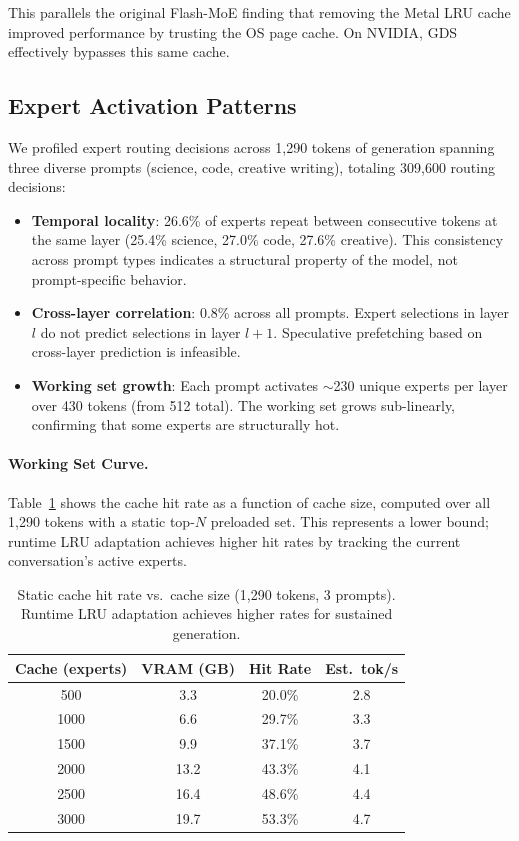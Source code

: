 \documentclass[11pt]{article}
\begin{document}
This parallels the original Flash-MoE finding that removing the Metal LRU cache improved performance by trusting the OS page cache. On NVIDIA, GDS effectively bypasses this same cache.

\subsection{Expert Activation Patterns}

We profiled expert routing decisions across 1,290 tokens of generation spanning three diverse prompts (science, code, creative writing), totaling 309,600 routing decisions:

\begin{itemize}[nosep]
    \item \textbf{Temporal locality}: 26.6\% of experts repeat between consecutive tokens at the same layer (25.4\% science, 27.0\% code, 27.6\% creative). This consistency across prompt types indicates a structural property of the model, not prompt-specific behavior.
    \item \textbf{Cross-layer correlation}: 0.8\% across all prompts. Expert selections in layer $l$ do not predict selections in layer $l+1$. Speculative prefetching based on cross-layer prediction is infeasible.
    \item \textbf{Working set growth}: Each prompt activates $\sim$230 unique experts per layer over 430 tokens (from 512 total). The working set grows sub-linearly, confirming that some experts are structurally hot.
\end{itemize}

\paragraph{Working Set Curve.} Table~\ref{tab:workingset} shows the cache hit rate as a function of cache size, computed over all 1,290 tokens with a static top-$N$ preloaded set. This represents a lower bound; runtime LRU adaptation achieves higher hit rates by tracking the current conversation's active experts.

\begin{table}[h]
\centering
\small
\caption{Static cache hit rate vs.\ cache size (1,290 tokens, 3 prompts). Runtime LRU adaptation achieves higher rates for sustained generation.}
\label{tab:workingset}
\begin{tabular}{cccc}
\toprule
\textbf{Cache (experts)} & \textbf{VRAM (GB)} & \textbf{Hit Rate} & \textbf{Est.\ tok/s} \\
\midrule
500 & 3.3 & 20.0\% & 2.8 \\
1000 & 6.6 & 29.7\% & 3.3 \\
1500 & 9.9 & 37.1\% & 3.7 \\
2000 & 13.2 & 43.3\% & 4.1 \\
2500 & 16.4 & 48.6\% & 4.4 \\
3000 & 19.7 & 53.3\% & 4.7 \\
\bottomrule
\end{tabular}
\end{table}
\end{document}
